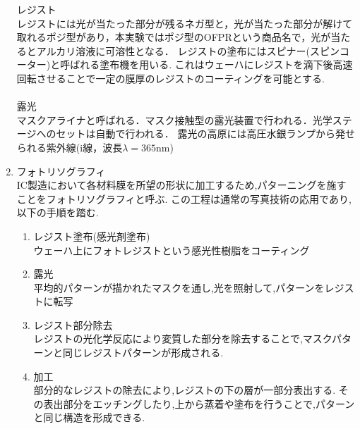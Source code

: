 \documentclass[11pt]{jarticle}
\begin{document}
\begin{enumerate}
				$\boldsymbol{レジスト}$\\
					レジストには光が当たった部分が残るネガ型と，光が当たった部分が解けて取れるポジ型があり，本実験ではポジ型のOFPRという商品名で，光が当たるとアルカリ溶液に可溶性となる．
					レジストの塗布にはスピナー(スピンコーター)と呼ばれる塗布機を用いる.
					これはウェーハにレジストを滴下後高速回転させることで一定の膜厚のレジストのコーティングを可能とする.\\
				\\
				$\boldsymbol{露光}$\\
					マスクアライナと呼ばれる．マスク接触型の露光装置で行われる．光学ステージへのセットは自動で行われる．
					露光の高原には高圧水銀ランプから発せられる紫外線(i線，波長$\lambda = 365$nm)


			\item フォトリソグラフィ\\
				IC製造において各材料膜を所望の形状に加工するため,パターニングを施すことをフォトリソグラフィと呼ぶ.
				この工程は通常の写真技術の応用であり,以下の手順を踏む.
				\begin{enumerate}
					\item レジスト塗布(感光剤塗布)\\
						ウェーハ上にフォトレジストという感光性樹脂をコーティング
					\item 露光\\
						平均的パターンが描かれたマスクを通し,光を照射して,パターンをレジストに転写
					\item レジスト部分除去\\
						レジストの光化学反応により変質した部分を除去することで,マスクパターンと同じレジストパターンが形成される.
					\item 加工\\
						部分的なレジストの除去により,レジストの下の層が一部分表出する.
						その表出部分をエッチングしたり,上から蒸着や塗布を行うことで,パターンと同じ構造を形成できる.
				\end{enumerate}
		\end{enumerate}
\end{document}
